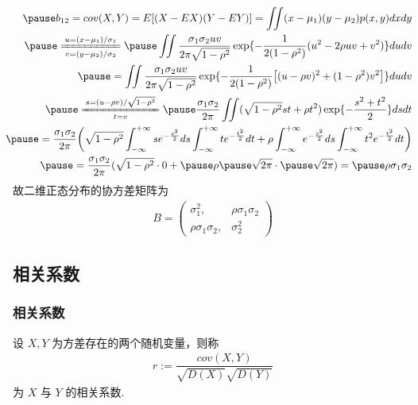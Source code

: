 \documentclass[Prob-All.tex]{subfiles}
\begin{document}
\begin{frame}

	{\small\begin{eqnarray*}
			&&\hspace{-0.4cm}\pause b_{12}=cov(X,Y)=E[(X-EX)(Y-EY)]=\iint (x-\mu_1)(y-\mu_2)p(x,y)dxdy\\
			&&\hspace{-0.6cm}\pause \xlongequal[v=(y-\mu_2)/\sigma_2]{u=(x-\mu_1)/\sigma_1}\pause \iint \dfrac{\sigma_1\sigma_2uv}{2\pi\sqrt{1-\rho^2}}\exp\{-\dfrac{1}{2(1-\rho^2)}(u^2-2\rho uv+v^2)\}dudv\\
			&&\hspace{-0.6cm}\pause= \iint \dfrac{\sigma_1\sigma_2uv}{2\pi\sqrt{1-\rho^2}}\exp\{-\dfrac{1}{2(1-\rho^2)}\big[(u-\rho v)^2+(1-\rho^2)v^2\big]\}dudv\\
			&&\hspace{-0.6cm}\pause \xlongequal[t=v]{s=(u-\rho v)/\sqrt{1-\rho^2}}\pause \dfrac{\sigma_1\sigma_2}{2\pi}\iint(\sqrt{1-\rho^2}st+\rho t^2) \exp\{-\dfrac{s^2+t^2}{2}\}dsdt\\
			&&\hspace{-0.6cm}\pause =\dfrac{\sigma_1\sigma_2}{2\pi}\bigg(\sqrt{1-\rho^2}\int_{-\infty}^{+\infty}se^{-\frac{s^2}{2}}ds\int_{-\infty}^{+\infty}te^{-\frac{t^2}{2}}dt+\rho\int_{-\infty}^{+\infty}e^{-\frac{s^2}{2}}ds\int_{-\infty}^{+\infty}t^2e^{-\frac{t^2}{2}}dt\bigg)\\
			&&\hspace{-0.6cm}\pause =\dfrac{\sigma_1\sigma_2}{2\pi}(\sqrt{1-\rho^2}\cdot 0+\pause \rho\pause  \sqrt{2\pi}\cdot\pause  \sqrt{2\pi})=\pause \rho \sigma_1\sigma_2
	\end{eqnarray*}}
	\pause   故二维正态分布的协方差矩阵为
	\begin{eqnarray*}
		B=\left(
		\begin{array}{cc}
			\sigma_1^2, &\rho\sigma_1\sigma_2\\
			\rho\sigma_1\sigma_2,&\sigma_2^2
		\end{array}
		\right)
	\end{eqnarray*}

\end{frame}
\subsection{相关系数}
\begin{frame}
	\frametitle{相关系数}
	\begin{defi}
		设 $X, Y$ 为方差存在的两个随机变量，则称
		\begin{eqnarray*}
			r:=\dfrac{cov(X,Y)}{\sqrt{D(X)}\sqrt{D(Y)}}
		\end{eqnarray*}
		为 $X$ 与 $Y$ 的相关系数.
	\end{defi}
\end{frame}
\end{document}
